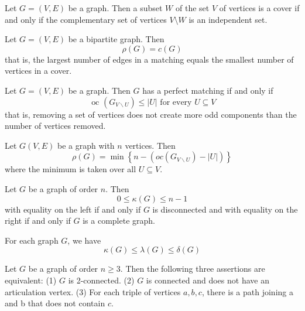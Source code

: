 \begin{theorem}
  \label{thm:12.5.2}
  Let $G = (V, E)$ be a graph. Then a subset $W$ of the set $V$ of vertices is a cover if and only if the complementary set of vertices $V \setminus W$ is an independent set.
\end{theorem}

\begin{theorem}
  \label{thm:12.5.3}
  Let $G=(V, E)$ be a bipartite graph. Then
  \begin{equation}\label{12.13}
    \rho(G)=c(G)
  \end{equation}
  that is, the largest number of edges in a matching equals the smallest number of vertices in a cover.
\end{theorem}

\begin{theorem}
  \label{thm:12.5.4}
  Let $G=(V, E)$ be a graph. Then $G$ has a perfect matching if and only if
  \begin{equation}\label{12.15}
    \text { oc }\left(G_{V \backslash U}\right) \leq|U| \text { for every } U \subseteq V
  \end{equation}
  that is, removing a set of vertices does not create more odd components than the number of vertices removed.
\end{theorem}

\begin{theorem}
  \label{thm:12.5.5}
  Let $G(V, E)$ be a graph with $n$ vertices. Then
  $$
  \rho(G)=\min \left\{n-\left(o c\left(G_{V \backslash U}\right)-|U|\right)\right\}
  $$
  where the minimum is taken over all $U \subseteq V$.
\end{theorem}

\begin{theorem}
  \label{thm:12.6.1}
  Let $G$ be a graph of order $n$. Then
  $$
  0 \leq \kappa(G) \leq n-1
  $$
  with equality on the left if and only if $G$ is disconnected and with equality on the right if and only if $G$ is a complete graph.
\end{theorem}

\begin{theorem}
  \label{thm:12.6.2}
  For each graph $G$, we have
  $$ \kappa(G) \leq \lambda(G) \leq \delta(G) $$
\end{theorem}

\begin{theorem}
  \label{thm:12.6.3}
  Let $G$ be a graph of order $n \geq 3$. Then the following three assertions are equivalent:
  (1) $G$ is 2-connected.
  (2) $G$ is connected and does not have an articulation vertex.
  (3) For each triple of vertices $a, b, c$, there is a path joining a and b that does not contain $c$.
\end{theorem}

